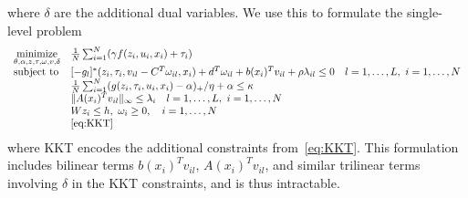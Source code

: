 where $\delta$ are the additional dual variables. We use this to formulate the single-level problem
\begin{equation}
	\begin{array}{ll}
			\label{eq:singlelevel-bilinear}
 \underset{\theta,\alpha,z,\tau,\omega,v,\delta}{\mbox{minimize}} & \frac{1}{N}\sum_{i=1}^N (\gamma f(z_i,u_i,x_i) +\tau_i )\\
		\mbox{subject to} 
        &[-g_l]^*(z_i,\tau_i,v_{il}-C^T\omega_{il},x_i) + 
        d^T\omega_{il} + b(x_i)^Tv_{il} + \rho\lambda_{il} \leq 0 \quad l = 1,\dots,L,~i=1,\dots,N \\
        &  \frac{1}{N}\sum_{i=1}^N (g(z_i,\tau_i,u_i,x_i)- \alpha)_+/\eta + \alpha \leq \kappa \\
 & \|A(x_i)^Tv_{il}\|_\infty \leq \lambda_{i} \quad l = 1,\dots,L,~i=1,\dots,N\\
    & Wz_i \leq h,~\omega_i \geq 0,\quad i = 1,\dots,N\\
        & \eqref{eq:KKT}
	\end{array}
\end{equation}
where KKT encodes the additional constraints from~\eqref{eq:KKT}.
This formulation includes bilinear terms $b(x_i)^Tv_{il}$, $A(x_i)^Tv_{il}$, and similar trilinear terms involving $\delta$ in the KKT constraints, and is thus intractable.

% 





